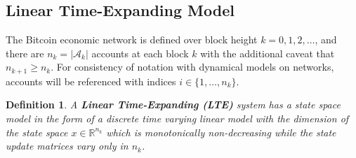 \documentclass[letterpaper, 10 pt, conference]{ieeeconf}  %
\newtheorem{definition}{Definition}
\begin{document}
\subsection{Linear Time-Expanding Model}




The Bitcoin economic network is defined over block height $k=0,1,2,\ldots$, and there are $n_k=|\mathcal{A}_k|$ accounts at each block $k$ with the additional caveat that $n_{k+1} \ge n_k$. For consistency of notation with dynamical models on networks, accounts will be referenced with indices $i\in\{1,\ldots, n_k\}$. 
\begin{definition}
A \textbf{Linear Time-Expanding (LTE)} system has a state space model in the form of a discrete time varying linear model with the dimension of the state space $x\in \mathbb{R}^{n_k}$ which is monotonically non-decreasing while the state update matrices vary only in $n_k$.
\end{definition}
\end{document}
